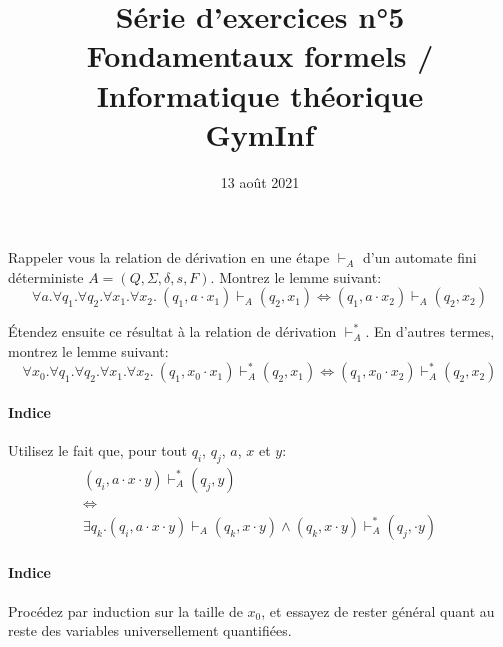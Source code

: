 \documentclass[12pt,french,a4paper]{article}
\begin{document}
\title{\vspace{-2cm}Série d'exercices n°5\\\large{Fondamentaux formels / Informatique théorique\\GymInf}}
\date{\vspace{-1cm}13 août 2021}

\maketitle

\begin{question}
Rappeler vous la relation de dérivation en une étape $\vdash_A$ d'un automate fini déterministe $A = (Q, \Sigma, \delta, s, F)$.
Montrez le lemme suivant:
\[
\forall a. \forall q_1. \forall q_2. \forall x_1. \forall x_2.\ (q_1, a \cdot x_1) \vdash_A (q_2, x_1) \iff  (q_1, a \cdot x_2) \vdash_A (q_2, x_2)
\]

Étendez ensuite ce résultat à la relation de dérivation $\vdash_A^*$.
En d'autres termes, montrez le lemme suivant:
\[
\forall x_0. \forall q_1. \forall q_2. \forall x_1. \forall x_2.\ (q_1, x_0 \cdot x_1) \vdash_A^* (q_2, x_1) \iff  (q_1, x_0 \cdot x_2) \vdash_A^* (q_2, x_2)
\]

\paragraph{Indice} Utilisez le fait que, pour tout $q_i$, $q_j$, $a$, $x$ et $y$:
\begin{gather*}
(q_i, a \cdot x \cdot y) \vdash_A^* (q_j, y)\\
\iff\\
\exists q_k. (q_i, a \cdot x \cdot y) \vdash_A (q_k, x \cdot y) \wedge (q_k, x \cdot y) \vdash_A^* (q_j, \cdot y)
\end{gather*}

\paragraph{Indice} Procédez par induction sur la taille de $x_0$, et essayez de rester général quant au reste des variables universellement quantifiées.

\end{question}
\end{document}
